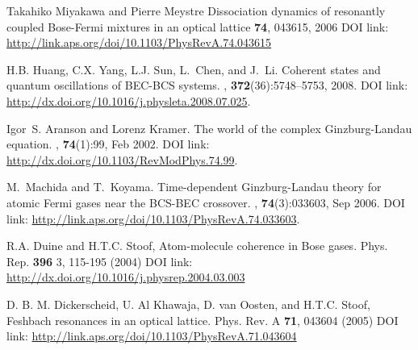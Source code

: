 \documentclass[a4paper,10pt]{article}
\begin{document}
\begin{thebibliography}{10}
Takahiko Miyakawa and Pierre Meystre 
\newblock Dissociation dynamics of resonantly coupled Bose-Fermi mixtures in an optical lattice
 \textbf{74}, 043615, 2006
\newblock DOI link: \url{http://link.aps.org/doi/10.1103/PhysRevA.74.043615}


H.B. Huang, C.X. Yang, L.J. Sun, L.~Chen, and J.~Li.
\newblock Coherent states and quantum oscillations of {BEC}-{BCS} systems.
, \textbf{372}(36):5748--5753, 2008.
\newblock DOI link: \url{http://dx.doi.org/10.1016/j.physleta.2008.07.025}.

Igor~S. Aranson and Lorenz Kramer.
\newblock The world of the complex {G}inzburg-{L}andau equation.
, \textbf{74}(1):99, Feb 2002.
\newblock DOI link: \url{http://dx.doi.org/10.1103/RevModPhys.74.99}.

M.~Machida and T.~Koyama.
\newblock Time-dependent {G}inzburg-{L}andau theory for atomic {F}ermi gases
  near the {BCS-BEC} crossover.
, \textbf{74}(3):033603, Sep 2006.
\newblock DOI link: \url{http://link.aps.org/doi/10.1103/PhysRevA.74.033603}.

R.A. Duine and H.T.C. Stoof,
\newblock Atom-molecule coherence in Bose gases.
\newblock Phys. Rep. {\bf 396} 3, 115-195 (2004)
\newblock DOI link: \url{http://dx.doi.org/10.1016/j.physrep.2004.03.003}

D. B. M. Dickerscheid, U. Al Khawaja, D. van Oosten, and H.T.C. Stoof,
\newblock Feshbach resonances in an optical lattice.
\newblock Phys. Rev. A {\bf 71}, 043604 (2005)
\newblock DOI link: \url{http://link.aps.org/doi/10.1103/PhysRevA.71.043604}




\end{thebibliography}
\end{document}
